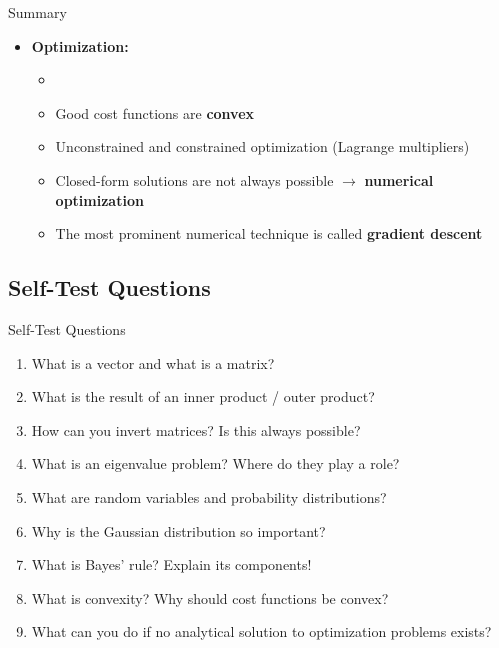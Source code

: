 \begin{frame}[allowframebreaks]{Summary}{}
\begin{itemize}
		\framebreak
		\item \textbf{Optimization:}
		\begin{itemize}
			\item {}
			\item Good cost functions are \textbf{convex}
			\item Unconstrained and constrained optimization (Lagrange multipliers)
			\item Closed-form solutions are not always possible $\rightarrow$ \textbf{numerical optimization}
			\item The most prominent numerical technique is called \textbf{gradient descent}
		\end{itemize}
	\end{itemize}
\end{frame}


\subsection{Self-Test Questions}

\begin{frame}{Self-Test Questions}{}\important
	\begin{enumerate}
		\item What is a vector and what is a matrix?
		\item What is the result of an inner product / outer product?
		\item How can you invert matrices? Is this always possible?
		\item What is an eigenvalue problem? Where do they play a role?
		\item What are random variables and probability distributions?
		\item Why is the Gaussian distribution so important?
		\item What is Bayes' rule? Explain its components!
		\item What is convexity? Why should cost functions be convex?
		\item What can you do if no analytical solution to optimization problems exists?
	\end{enumerate}
\end{frame}


